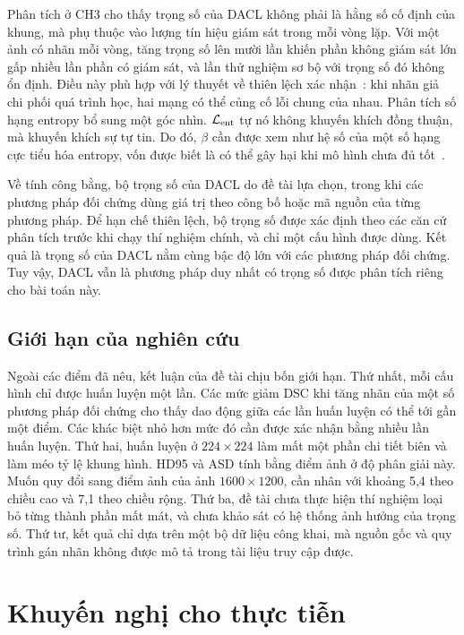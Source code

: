 Phân tích ở CH3 cho thấy trọng số của DACL không phải là hằng số cố định của khung, mà phụ thuộc vào lượng tín hiệu giám sát trong mỗi vòng lặp. Với một ảnh có nhãn mỗi vòng, tăng trọng số lên mười lần khiến phần không giám sát lớn gấp nhiều lần phần có giám sát, và lần thử nghiệm sơ bộ với trọng số đó không ổn định. Điều này phù hợp với lý thuyết về thiên lệch xác nhận~\cite{arazo2020pseudo}: khi nhãn giả chi phối quá trình học, hai mạng có thể củng cố lỗi chung của nhau. Phân tích số hạng entropy bổ sung một góc nhìn. $\mathcal{L}_{\mathrm{ent}}$ tự nó không khuyến khích đồng thuận, mà khuyến khích sự tự tin. Do đó, $\beta$ cần được xem như hệ số của một số hạng cực tiểu hóa entropy, vốn được biết là có thể gây hại khi mô hình chưa đủ tốt~\cite{grandvalet2005entropy}.

Về tính công bằng, bộ trọng số của DACL do đề tài lựa chọn, trong khi các phương pháp đối chứng dùng giá trị theo công bố hoặc mã nguồn của từng phương pháp. Để hạn chế thiên lệch, bộ trọng số được xác định theo các căn cứ phân tích trước khi chạy thí nghiệm chính, và chỉ một cấu hình được dùng. Kết quả là trọng số của DACL nằm cùng bậc độ lớn với các phương pháp đối chứng. Tuy vậy, DACL vẫn là phương pháp duy nhất có trọng số được phân tích riêng cho bài toán này.

\subsection{Giới hạn của nghiên cứu}

Ngoài các điểm đã nêu, kết luận của đề tài chịu bốn giới hạn. Thứ nhất, mỗi cấu hình chỉ được huấn luyện một lần. Các mức giảm DSC khi tăng nhãn của một số phương pháp đối chứng cho thấy dao động giữa các lần huấn luyện có thể tới gần một điểm. Các khác biệt nhỏ hơn mức đó cần được xác nhận bằng nhiều lần huấn luyện. Thứ hai, huấn luyện ở $224\times224$ làm mất một phần chi tiết biên và làm méo tỷ lệ khung hình. HD95 và ASD tính bằng điểm ảnh ở độ phân giải này. Muốn quy đổi sang điểm ảnh của ảnh $1600\times1200$, cần nhân với khoảng 5,4 theo chiều cao và 7,1 theo chiều rộng. Thứ ba, đề tài chưa thực hiện thí nghiệm loại bỏ từng thành phần mất mát, và chưa khảo sát có hệ thống ảnh hưởng của trọng số. Thứ tư, kết quả chỉ dựa trên một bộ dữ liệu công khai, mà nguồn gốc và quy trình gán nhãn không được mô tả trong tài liệu truy cập được.

\section{Khuyến nghị cho thực tiễn}

